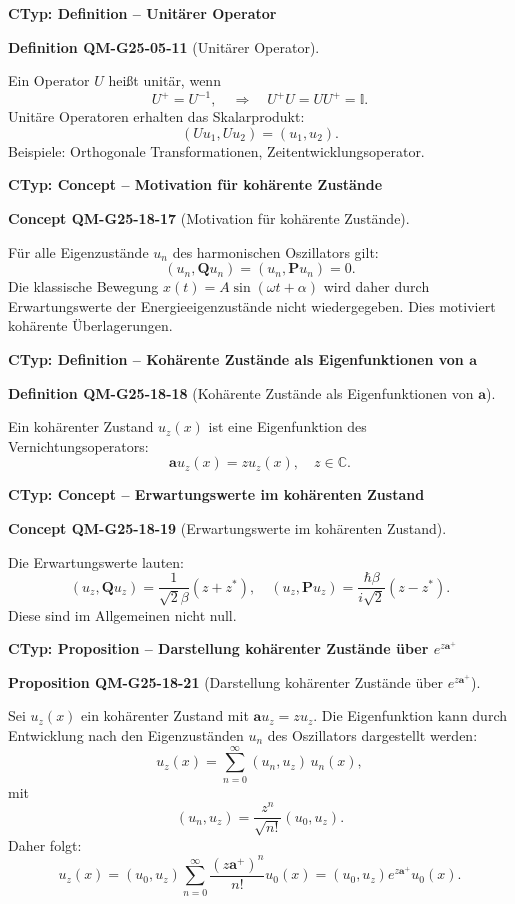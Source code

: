 \documentclass[10pt, letterpaper]{article}
\newcommand{\CustomHeading}[3]{%
  \par\medskip\noindent%
  \textbf{#1 #2} \textnormal{(#3)}.\enskip%
}
\newenvironment{DEF}[2]{\begin{unitbox}\CustomHeading{Definition}{#1}{#2}}{\end{unitbox}}
\newenvironment{PROP}[2]{\begin{unitbox}\CustomHeading{Proposition}{#1}{#2}}{\end{unitbox}}
\newenvironment{CONC}[2]{\begin{unitbox}\CustomHeading{Concept}{#1}{#2}}{\end{unitbox}}
\begin{document}
\textbf{CTyp: Definition – Unitärer Operator}

\begin{DEF}{QM-G25-05-11}{Unitärer Operator}
Ein Operator $U$ heißt unitär, wenn
\[
U^+ = U^{-1}, \quad \Rightarrow \quad U^+ U = UU^+ = \mathbb{I}.
\]
Unitäre Operatoren erhalten das Skalarprodukt:
\[
(U u_1, U u_2) = (u_1, u_2).
\]
Beispiele: Orthogonale Transformationen, Zeitentwicklungsoperator.
\end{DEF}



\textbf{CTyp: Concept – Motivation für kohärente Zustände}

\begin{CONC}{QM-G25-18-17}{Motivation für kohärente Zustände}
Für alle Eigenzustände $u_n$ des harmonischen Oszillators gilt:
\[
(u_n, \mathbf{Q} u_n) = (u_n, \mathbf{P} u_n) = 0.
\]
Die klassische Bewegung $x(t) = A\sin(\omega t + \alpha)$ wird daher durch Erwartungswerte der Energieeigenzustände nicht wiedergegeben. Dies motiviert kohärente Überlagerungen.
\end{CONC}


\textbf{CTyp: Definition – Kohärente Zustände als Eigenfunktionen von $\mathbf{a}$}

\begin{DEF}{QM-G25-18-18}{Kohärente Zustände als Eigenfunktionen von $\mathbf{a}$}
Ein kohärenter Zustand $u_z(x)$ ist eine Eigenfunktion des Vernichtungsoperators:
\[
\mathbf{a} u_z(x) = z u_z(x), \quad z \in \mathbb{C}.
\]
\end{DEF}


\textbf{CTyp: Concept – Erwartungswerte im kohärenten Zustand}

\begin{CONC}{QM-G25-18-19}{Erwartungswerte im kohärenten Zustand}
Die Erwartungswerte lauten:
\[
\left(u_z, \mathbf{Q} u_z\right) = \frac{1}{\sqrt{2} \beta} (z + z^*), \quad
\left(u_z, \mathbf{P} u_z\right) = \frac{\hbar \beta}{i \sqrt{2}} (z - z^*).
\]
Diese sind im Allgemeinen nicht null.
\end{CONC}


\textbf{CTyp: Proposition – Darstellung kohärenter Zustände über $e^{z\mathbf{a}^+}$}

\begin{PROP}{QM-G25-18-21}{Darstellung kohärenter Zustände über $e^{z\mathbf{a}^+}$}
Sei $u_z(x)$ ein kohärenter Zustand mit $\mathbf{a} u_z = z u_z$. Die Eigenfunktion kann durch Entwicklung nach den Eigenzuständen $u_n$ des Oszillators dargestellt werden:
\[
u_z(x) = \sum_{n=0}^\infty (u_n, u_z) \, u_n(x),
\]
mit
\[
(u_n, u_z) = \frac{z^n}{\sqrt{n!}} (u_0, u_z).
\]
Daher folgt:
\[
u_z(x) = (u_0, u_z) \sum_{n=0}^\infty \frac{(z \mathbf{a}^+)^n}{n!} u_0(x) = (u_0, u_z) e^{z \mathbf{a}^+} u_0(x).
\]
\end{PROP}
\end{document}
